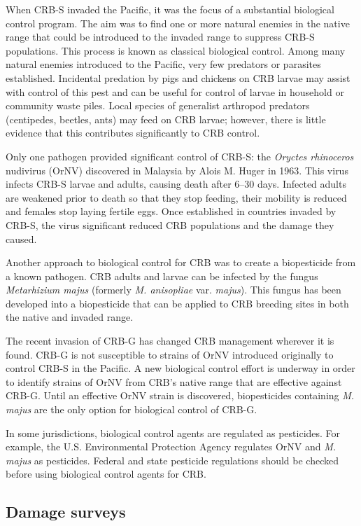 \documentclass[twocolumn,letterpaper]{scrartcl}
\begin{document}
When CRB-S invaded the Pacific, it was the focus of a substantial biological control  program.  The  aim was to find one or more natural enemies in the native range that could be introduced to the invaded range to  suppress  CRB-S  populations.  This  process  is  known  as  classical  biological  control. Among many natural enemies introduced to the Pacific, very few predators or parasites established. Incidental predation by pigs and chickens on CRB larvae may assist with control of this pest and can be useful for control of larvae in household or community waste piles. Local species of generalist arthropod predators (centipedes, beetles, ants) may feed on CRB larvae; however, there is 
little evidence that this contributes significantly to CRB control. 

Only one pathogen provided significant control of CRB-S: the \textit{Oryctes rhinoceros} nudivirus (OrNV) discovered in Malaysia by Alois M. Huger in 1963. This virus infects CRB-S larvae and adults, causing death after 6–30 days. Infected adults are weakened prior to death so that they stop feeding, their mobility is reduced and females stop laying fertile eggs. Once established in countries invaded by CRB-S, the virus significant reduced CRB populations and the damage they caused. 

Another approach to biological control for CRB was to create a biopesticide from a known pathogen. CRB adults and larvae can be infected by the fungus \textit{Metarhizium majus} (formerly \textit{M. anisopliae} var. \textit{majus}). This fungus has been developed into 
a biopesticide that can be applied to CRB breeding sites in both the native and invaded range. 

The recent invasion of CRB-G has changed CRB management wherever it is found. CRB-G is not susceptible to strains of OrNV introduced originally to control CRB-S in the Pacific. A new biological control effort is underway in order to identify strains of OrNV from CRB’s native range that are effective against CRB-G. Until an effective OrNV strain is discovered, biopesticides containing \textit{M. majus} are the only option for biological control of CRB-G.

In some jurisdictions, biological control agents are regulated as pesticides. For example, the U.S. Environmental Protection Agency regulates OrNV and \textit{M. majus} as pesticides. Federal and state pesticide regulations should be checked before using biological control agents for CRB. 

\subsection{Damage surveys}
\end{document}
